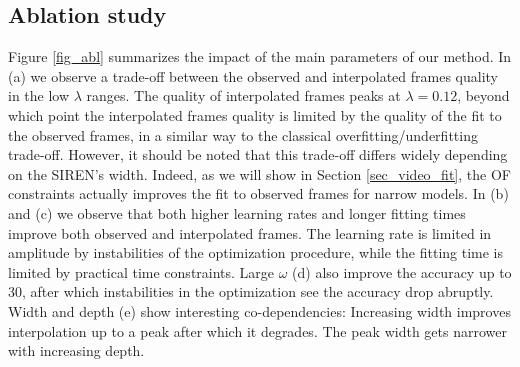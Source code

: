 \documentclass{article}
\begin{document}
\subsection{Ablation study}
\label{sec_abl}

Figure \ref{fig_abl} summarizes the impact of the main parameters of our method.
In (a) we observe a trade-off between the observed and interpolated frames quality in the low $\lambda$ ranges.
The quality of interpolated frames peaks at $\lambda=0.12$, beyond which point the interpolated frames quality is limited
by the quality of the fit to the observed frames, in a similar way to the classical overfitting/underfitting trade-off.
However, it should be noted that this trade-off differs widely depending on the SIREN's width.
Indeed, as we will show in Section \ref{sec_video_fit},
the OF constraints actually improves the fit to observed frames for narrow models.
In (b) and (c) we observe that both higher learning rates and longer fitting times
improve both observed and interpolated frames.
The learning rate is limited in amplitude by instabilities of the optimization procedure,
while the fitting time is limited by practical time constraints.
Large $\omega$ (d) also improve the accuracy up to 30,
after which instabilities in the optimization see the accuracy drop abruptly.
Width and depth (e) show interesting co-dependencies:
Increasing width improves interpolation up to a peak after which it degrades.
The peak width gets narrower with increasing depth.
\end{document}
